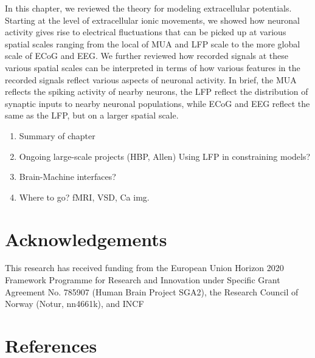 \documentclass[preprint,11pt,authoryear]{elsarticle}
\newcommand{\hlR}[2][red]{ {\sethlcolor{#1} \hl{#2}} }
\newcommand{\gen}[1]{\color{white}{\hlR{GTE: #1 }}\color{black}}
\newcommand{\gex}[1]{{\color{red}#1}}
\begin{document}
In this chapter, we reviewed the theory for modeling extracellular potentials. Starting at the level of extracellular ionic movements, we showed how neuronal activity gives rise to electrical fluctuations that can be picked up at various spatial scales ranging from the local of MUA and LFP scale to the more global scale of ECoG and EEG. We further reviewed how recorded signals at these various spatial scales can be interpreted in terms of how various features in the recorded signals reflect various aspects of neuronal activity. In brief, the MUA reflects the spiking activity of nearby neurons, the LFP reflect the distribution of synaptic inputs to nearby neuronal populations, while ECoG and EEG reflect the same as the LFP, but on a larger spatial scale. 


\begin{enumerate}
 \item Summary of chapter
 \item Ongoing large-scale projects (HBP, Allen)
 \subitem Using LFP in constraining models?
 \item Brain-Machine interfaces?
 \item Where to go?
 \subitem fMRI, VSD, Ca img.
\end{enumerate}



\section*{Acknowledgements}
\label{sec:acknowledgements}
This research has received funding from the European Union Horizon 2020 Framework Programme for Research
and Innovation under Specific Grant Agreement No. 785907 (Human Brain Project SGA2), the Research Council of Norway (Notur, nn4661k), and \gex{INCF} \gen{Fill in project info.}




\section*{References}
\label{sec:bibliography}


\end{document}
